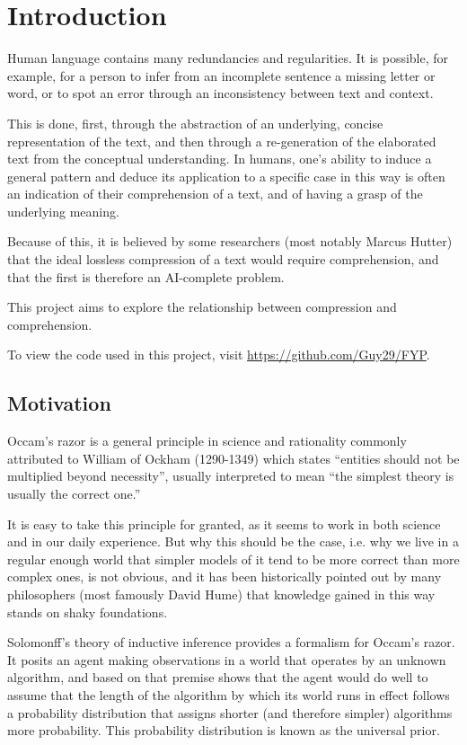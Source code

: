\chapter{Introduction}

Human language contains many redundancies and regularities. It is possible, for example, for a person to infer from an incomplete sentence a missing letter or word, or to spot an error through an inconsistency between text and context.

This is done, first, through the abstraction of an underlying, concise representation of the text, and then through a re-generation of the elaborated text from the conceptual understanding. In humans, one's ability to induce a general pattern and deduce its application to a specific case in this way is often an indication of their comprehension of a text, and of having a grasp of the underlying meaning.

Because of this, it is believed by some researchers (most notably Marcus Hutter) that the ideal lossless compression of a text would require comprehension, and that the first is therefore an AI-complete problem.

This project aims to explore the relationship between compression and comprehension.

To view the code used in this project, visit \url{https://github.com/Guy29/FYP}.

\section{Motivation}
\label{sec:motivation}

Occam’s razor is a general principle in science and rationality commonly attributed to William of Ockham (1290-1349) which states “entities should not be multiplied beyond necessity”, usually interpreted to mean “the simplest theory is usually the correct one.”

It is easy to take this principle for granted, as it seems to work in both science and in our daily experience. But why this should be the case, i.e. why we live in a regular enough world that simpler models of it tend to be more correct than more complex ones, is not obvious, and it has been historically pointed out by many philosophers (most famously David Hume) that knowledge gained in this way stands on shaky foundations. \autocite{Henderson2018}

Solomonff’s theory of inductive inference provides a formalism for Occam’s razor. It posits an agent making observations in a world that operates by an unknown algorithm, and based on that premise shows that the agent would do well to assume that the length of the algorithm by which its world runs in effect follows a probability distribution that assigns shorter (and therefore simpler) algorithms more probability. This probability distribution is known as the universal prior.

